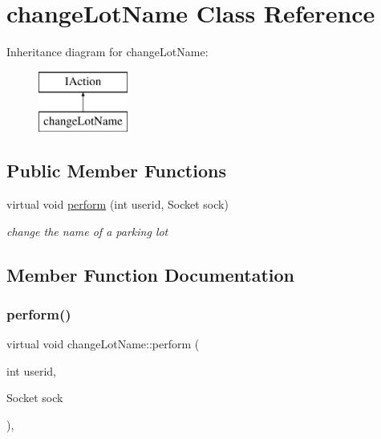 \hypertarget{classchange_lot_name}{}\section{change\+Lot\+Name Class Reference}
\label{classchange_lot_name}
Inheritance diagram for change\+Lot\+Name\+:\begin{figure}[H]
\begin{center}
\leavevmode
\includegraphics[height=2.000000cm]{classchange_lot_name}
\end{center}
\end{figure}
\subsection*{Public Member Functions}
\begin{DoxyCompactItemize}
\item 
virtual void \mbox{\hyperlink{classchange_lot_name_a0529a32316995ee8db0dd3e8c12f3efc}{perform}} (int userid, Socket sock)
\begin{DoxyCompactList}\small\item\em change the name of a parking lot \end{DoxyCompactList}\end{DoxyCompactItemize}


\subsection{Member Function Documentation}
\mbox{\label{classchange_lot_name_a0529a32316995ee8db0dd3e8c12f3efc}} 
\subsubsection{\texorpdfstring{perform()}{perform()}}
{\footnotesize\ttfamily virtual void change\+Lot\+Name\+::perform (\begin{DoxyParamCaption}\item[{int}]{userid,  }\item[{Socket}]{sock }\end{DoxyParamCaption})\hspace{0.3cm}{\ttfamily [inline]}, {\ttfamily [virtual]}}



